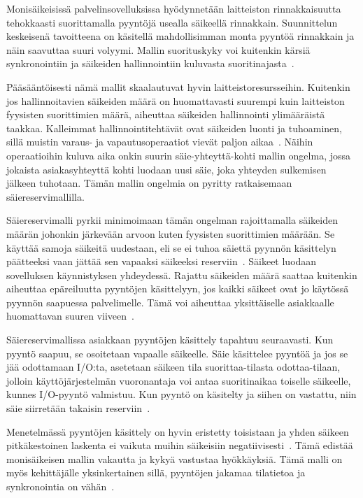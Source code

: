 \documentclass[finnish]{tktltiki2}%
\theoremstyle{definition}
\theoremstyle{remark}
\begin{document}
Monisäikeisissä palvelinsovelluksissa hyödynnetään laitteiston
rinnakkaisuutta tehokkaasti suorittamalla pyyntöjä usealla säikeellä rinnakkain.
Suunnittelun keskeisenä tavoitteena on käsitellä mahdollisimman monta pyyntöä rinnakkain ja
näin saavuttaa suuri volyymi. Mallin suorituskyky voi kuitenkin
kärsiä synkronointiin ja säikeiden hallinnointiin kuluvasta
suoritinajasta~\cite{hu_applying_1998}.

Pääsääntöisesti nämä mallit skaalautuvat hyvin laitteistoresursseihin.
Kuitenkin jos hallinnoitavien säikeiden määrä on huomattavasti suurempi kuin laitteiston
fyysisten suorittimien määrä, aiheuttaa säikeiden hallinnointi ylimääräistä taakkaa.
Kalleimmat hallinnointitehtävät ovat säikeiden luonti ja tuhoaminen, sillä
muistin varaus- ja vapautusoperaatiot vievät paljon aikaa~\cite{ling_analysis_2000}.
Näihin operaatioihin kuluva aika onkin suurin säie-yhteyttä-kohti mallin
ongelma, jossa jokaista asiakasyhteyttä kohti
luodaan uusi säie, joka yhteyden sulkemisen jälkeen tuhotaan.
Tämän mallin ongelmia on pyritty ratkaisemaan säiereservimallilla.

Säiereservimalli pyrkii minimoimaan tämän ongelman rajoittamalla
säikeiden määrän johonkin järkevään arvoon kuten fyysisten suorittimien
määrään. 
Se käyttää samoja säikeitä uudestaan, eli se ei tuhoa säiettä
pyynnön käsittelyn päätteeksi vaan jättää sen vapaaksi säikeeksi reserviin~\cite{ling_analysis_2000}. 
Säikeet luodaan sovelluksen käynnistyksen yhdeydessä.
Rajattu säikeiden määrä saattaa kuitenkin aiheuttaa epäreiluutta
pyyntöjen käsittelyyn, jos kaikki säikeet ovat jo käytössä pyynnön
saapuessa palvelimelle. Tämä voi aiheuttaa yksittäiselle asiakkaalle
huomattavan suuren viiveen~\cite{welsh_seda_2001}.

Säiereservimallissa asiakkaan pyyntöjen käsittely tapahtuu seuraavasti.
Kun pyyntö saapuu, se osoitetaan vapaalle säikeelle. Säie käsittelee pyyntöä ja
jos se jää odottamaan I/O:ta, asetetaan säikeen tila suorittaa-tilasta odottaa-tilaan,
jolloin käyttöjärjestelmän vuoronantaja voi antaa suoritinaikaa toiselle säikeelle,
kunnes I/O-pyyntö valmistuu. Kun pyyntö on käsitelty ja siihen on vastattu, niin
säie siirretään takaisin reserviin~\cite{ling_analysis_2000}.

Menetelmässä pyyntöjen käsittely on hyvin eristetty toisistaan ja
yhden säikeen pitkäkestoinen laskenta ei vaikuta muihin säikeisiin negatiivisesti~\cite{davis_case_2017}.
Tämä edistää monisäikeisen mallin vakautta ja kykyä vastustaa hyökkäyksiä.
Tämä malli on myös kehittäjälle yksinkertainen sillä, pyyntöjen jakamaa tilatietoa
ja synkronointia on vähän~\cite{hu_applying_1998}.
\end{document}

